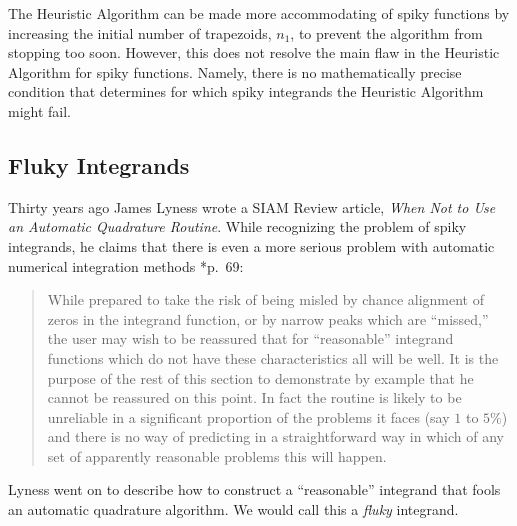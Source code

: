 \documentclass[]{article}
\theoremstyle{definition}
\theoremstyle{remark}
\begin{document}
The Heuristic Algorithm can be made more accommodating of spiky functions by increasing the initial number of trapezoids, $n_1$, to prevent the algorithm from stopping too soon.  However, this does not resolve the main flaw in the Heuristic Algorithm for spiky functions.  Namely, there is no mathematically precise condition that determines for which spiky integrands the Heuristic Algorithm might fail.


\subsection{Fluky Integrands} \label{flukysubsec}

Thirty years ago James Lyness wrote a SIAM Review article, \emph{When Not to Use an Automatic Quadrature Routine}.  While recognizing the problem of spiky integrands, he claims that there is even a more serious problem with automatic numerical integration methods   \cite{Lyn83}*{p.\ 69}:
\begin{quote}
While prepared to take the risk of being misled by chance alignment of zeros in the integrand function, or by narrow peaks which are ``missed,'' the user may wish to be reassured that for ``reasonable'' integrand functions which do not have these characteristics all will be well. It is the purpose of the rest of this section to demonstrate by example that he cannot be reassured on this point. In fact the routine is likely to be unreliable in a significant proportion of the problems it faces (say $1$ to $5\%$) and there is no way of predicting in a straightforward way in which of any set of apparently reasonable problems this will happen.
\end{quote}
Lyness went on to describe how to construct a ``reasonable'' integrand that fools an automatic quadrature algorithm.  We would call this a \emph{fluky} integrand.  
\end{document}
